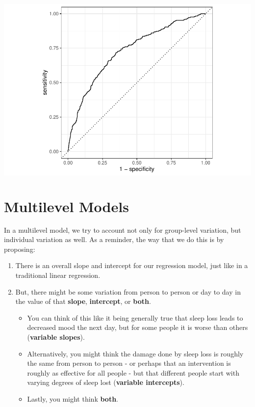 \documentclass[
]{book}
\providecommand{\tightlist}{%
  \setlength{\itemsep}{0pt}\setlength{\parskip}{0pt}}
\begin{document}
\includegraphics{_main_files/figure-latex/unnamed-chunk-140-1.pdf}

\hypertarget{multilevel-models}{%
\chapter{Multilevel Models}\label{multilevel-models}}

In a multilevel model, we try to account not only for group-level variation, but individual variation as well. As a reminder, the way that we do this is by proposing:

\begin{enumerate}
\def\labelenumi{\arabic{enumi}.}
\item
  There is an overall slope and intercept for our regression model, just like in a traditional linear regression.
\item
  But, there might be some variation from person to person or day to day in the value of that \textbf{slope}, \textbf{intercept}, or \textbf{both}.

  \begin{itemize}
  \tightlist
  \item
    You can think of this like it being generally true that sleep loss leads to decreased mood the next day, but for some people it is worse than others (\textbf{variable slopes}).
  \item
    Alternatively, you might think the damage done by sleep loss is roughly the same from person to person - or perhaps that an intervention is roughly as effective for all people - but that different people start with varying degrees of sleep lost (\textbf{variable intercepts}).
  \item
    Lastly, you might think \textbf{both}.
  \end{itemize}
\end{enumerate}
\end{document}
